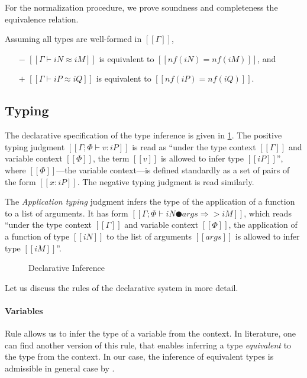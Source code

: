 For the normalization procedure, 
we prove soundness and completeness \wrt the equivalence relation.
\begin{property}
  Assuming all types are well-formed in $[[Γ]]$,
  \begin{itemize}
    \item[$-$] $[[Γ ⊢ iN ≈ iM]]$ is equivalent to $[[nf(iN) = nf(iM)]]$, and
    \item[$+$] $[[Γ ⊢ iP ≈ iQ]]$ is equivalent to $[[nf(iP) = nf(iQ)]]$.
  \end{itemize}
\end{property}


\subsection{Typing}

The declarative specification of the type inference is given in 
\cref{fig:declarative-inference}.
The positive typing judgment $[[Γ ; Φ ⊢ v : iP]]$ is read as 
``under the type context $[[Γ]]$ and variable context $[[Φ]]$,
the term $[[v]]$ is allowed to infer type $[[iP]]$'',
where $[[Φ]]$---the variable context---is defined standardly as
a set of pairs of the form $[[x : iP]]$. 
The negative typing judgment is read similarly.

The \emph{Application typing} judgment
infers the type of the application of a function to a list of arguments.
It has form $[[Γ ; Φ ⊢ iN ● args ⇒> iM]]$, 
which reads ``under the type context $[[Γ]]$ and variable context $[[Φ]]$,
the application of a function of type $[[iN]]$ to the list of arguments $[[args]]$
is allowed to infer type $[[iM]]$''.

\begin{figure}[h]
  \ottdefnsDTLabeled
  \caption{Declarative Inference}
  \label{fig:declarative-inference}
\end{figure}

Let us discuss the rules of the declarative system in more detail.

\paragraph{Variables}
  Rule  allows us to infer
  the type of a variable from the context. 
  In literature, one can find another version of this rule,
  that enables inferring a type \emph{equivalent}
  to the type from the context. 
  In our case, the inference of equivalent types
  is admissible in general case by .

